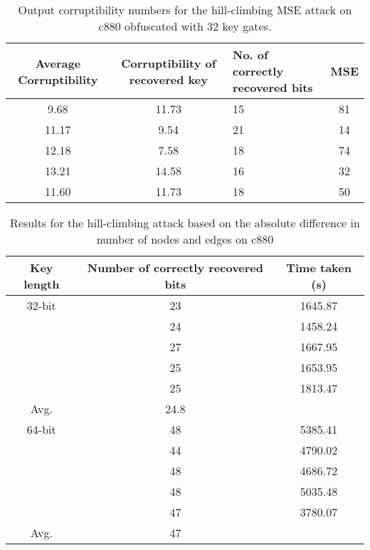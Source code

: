 \begin{table*}
\caption{Output corruptibility numbers for the hill-climbing MSE attack on c880 obfuscated with 32 key gates. }
\begin{tabular}{ | c | c | p{5cm} | c | }
\hline
Average Corruptibility  & Corruptibility of recovered key  & No. of correctly recovered bits & MSE\\
\hline
9.68 & 11.73 & 15 & 81\\

11.17 & 9.54 & 21 & 14\\

12.18 & 7.58 & 18 & 74\\

13.21 & 14.58 & 16 & 32\\

11.60 & 11.73 & 18 & 50\\
\hline
\end{tabular}
\end{table*}

\begin{table}
\caption{Results for the hill-climbing attack based on the absolute difference in number of nodes and edges on c880}
\begin{tabular}{ | c | c | c | }
\hline
Key length & Number of correctly recovered bits & Time taken (s) \\
\hline
32-bit & 23&                                                         1645.87\\
&24&                                                         1458.24\\
&27&                                                         1667.95\\
&25&                                                         1653.95\\
&25&                                                         1813.47\\
Avg. & 24.8 &\\
\hline
64-bit & 48 &                                                         5385.41 \\
& 44 &                                                         4790.02 \\
&48&                                                         4686.72 \\
&48&                                                         5035.48 \\
& 47&                                                         3780.07\\
Avg. & 47&\\
\hline
\end{tabular}
\end{table}

